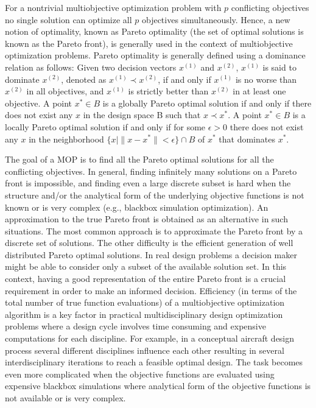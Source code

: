 For a nontrivial multiobjective optimization problem with $p$ conflicting 
objectives no single solution can optimize all $p$ objectives simultaneously. 
Hence, a new notion of optimality, known as Pareto optimality (the set of 
optimal solutions is known as the Pareto front), is generally used in the
context of multiobjective optimization problems. Pareto optimality is generally
defined using a dominance relation as follows: Given two decision vectors
$x^{(1)}$ and $x^{(2)}$, $x^{(1)}$ is said to dominate $x^{(2)}$, denoted as
$x^{(1)}\prec x^{(2)}$, if and only if $x^{(1)}$ is no worse than $x^{(2)}$ in
all objectives, and $x^{(1)}$ is strictly better than $x^{(2)}$ in at least one
objective. A point $x^*\in B$ is a globally Pareto optimal solution if and only
if there does not exist any $x$ in the design space B such that $x\prec x^*$.
A point $x^*\in B$ is a locally Pareto optimal solution if and only if for some
$\epsilon > 0$ there does not exist any $x$ in the neighborhood $\bigl\{ x
\mid\|x-x^*\| <\epsilon \bigr\}\cap B$ of $x^*$ that dominates $x^*$.  

The goal of a MOP is to find all the Pareto optimal solutions for all the
conflicting objectives. In general, finding infinitely many solutions on a
Pareto front is impossible, and finding even a large discrete subset is hard
when the structure and/or the analytical form of the underlying objective
functions is not known or is very complex (e.g., blackbox simulation
optimization). An approximation to the true Pareto front is obtained as an
alternative in such situations. The most common approach is to approximate the
Pareto front by a discrete set of solutions. The other difficulty is the
efficient generation of well distributed Pareto optimal solutions. In real
design problems a decision maker might be able to consider only a subset of the
available solution set. In this context, having a good representation of the
entire Pareto front is a crucial requirement in order to make an informed
decision. Efficiency (in terms of the total number of true function
evaluations) of a multiobjective optimization algorithm is a key factor in
practical multidisciplinary design optimization problems where a design cycle
involves time consuming and expensive computations for each discipline. For
example, in a conceptual aircraft design process several different disciplines
influence each other resulting in several interdisciplinary iterations 
to reach a feasible optimal design. The task becomes even more complicated 
when the objective functions are evaluated using expensive blackbox 
simulations where analytical form of the objective functions is not 
available or is very complex.  

